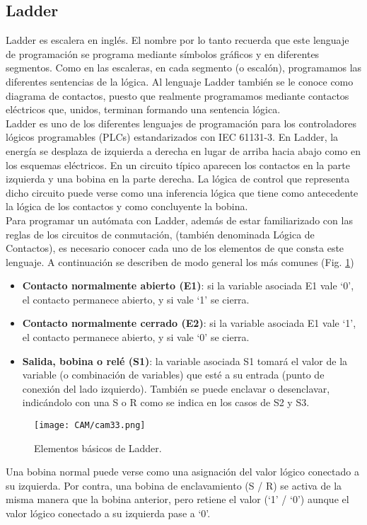 \documentclass[
	12pt, %
	fleqn, %
	a4paper, %
	oneside, %
]{LegrandOrangeBook}
\begin{document}
\subsection{Ladder}
Ladder es escalera en inglés. El nombre por lo tanto recuerda que este lenguaje de programación se programa mediante símbolos gráficos y en diferentes segmentos. Como en las escaleras, en cada segmento (o escalón), programamos las diferentes sentencias de la lógica. Al lenguaje Ladder también se le conoce como diagrama de contactos, puesto que realmente programamos mediante contactos eléctricos que, unidos, terminan formando una sentencia lógica.\\
Ladder es uno de los diferentes lenguajes de programación para los controladores lógicos programables (PLCs) estandarizados con IEC 61131-3. En Ladder, la energía se desplaza de izquierda a derecha en lugar de arriba hacia abajo como en los esquemas eléctricos. En un circuito típico aparecen los contactos en la parte izquierda y una bobina en la parte derecha. La lógica de control que representa dicho circuito puede verse como una inferencia lógica que tiene como antecedente la lógica de los contactos y como concluyente la bobina.\\
Para programar un autómata con Ladder, además de estar familiarizado con las reglas de los circuitos de conmutación, (también denominada Lógica de Contactos), es necesario conocer cada uno de los elementos de que consta este lenguaje. A continuación se describen de modo general los más comunes (Fig. \ref{fig:basicos ladder})
\begin{itemize}
\item \textbf{Contacto normalmente abierto (E1)}: si la variable asociada E1 vale ‘0’, el contacto permanece abierto, y si vale ‘1’ se cierra.
\item \textbf{Contacto normalmente cerrado (E2)}: si la variable asociada E1 vale ‘1’, el contacto permanece abierto, y si vale ‘0’ se cierra.
\item \textbf{Salida, bobina o relé (S1)}: la variable asociada S1 tomará el valor de la variable (o combinación de variables) que esté a su entrada (punto de conexión del lado izquierdo). También se puede enclavar o desenclavar, indicándolo con una S o R como se indica en los casos de S2 y S3.
\end{itemize}
\begin{figure}[]
\centering
\texttt{[image: CAM/cam33.png]}
\caption{Elementos básicos de Ladder.}
\label{fig:basicos ladder}
\end{figure}
\begin{notation}
Una bobina normal puede verse como una asignación del valor lógico conectado a su izquierda. Por contra, una bobina de enclavamiento (S / R) se activa de la misma manera que la bobina anterior, pero retiene el valor (‘1’ / ‘0’) aunque el valor lógico conectado a su izquierda pase a ‘0’.
\end{notation}
\end{document}
